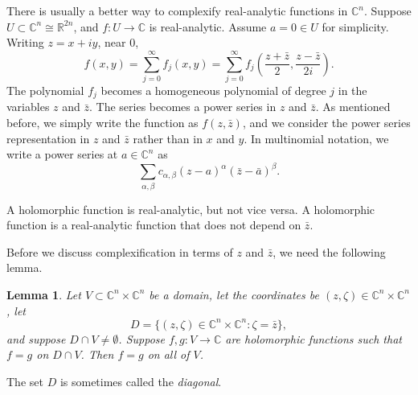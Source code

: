 \documentclass[12pt,openany]{book}
\newcommand{\C}{{\mathbb{C}}}
\newcommand{\R}{{\mathbb{R}}}
\newcommand{\myindex}[1]{#1\index{#1}}
\theoremstyle{plain}
\newtheorem{lemma}[thm]{Lemma}
\theoremstyle{remark}
\theoremstyle{definition}
\theoremstyle{exercise}
\theoremstyle{example}
\begin{document}
There is usually a better way to complexify 
real-analytic functions in $\C^n$.
Suppose $U \subset \C^n \cong \R^{2n}$, and $f \colon U \to
\C$ is real-analytic.  Assume $a=0 \in U$ for simplicity.
Writing $z = x+iy$, near $0$,
\begin{equation*}
f(x,y)
= 
\sum_{j=0}^\infty
f_j(x,y)
= 
\sum_{j=0}^\infty
f_j\left(
\frac{z+\bar{z}}{2},
\frac{z-\bar{z}}{2i}\right) .
\end{equation*}
The polynomial $f_j$ becomes a homogeneous polynomial of degree $j$
in the variables $z$ and $\bar{z}$.  The 
series becomes a power series in $z$ and $\bar{z}$.  As mentioned before,
we simply write the function as $f(z,\bar{z})$, and we consider the
power series representation in $z$ and $\bar{z}$ rather than
in $x$ and $y$.
In multinomial notation, we write a power series at $a \in \C^n$ as
\begin{equation*}
\sum_{\alpha,\beta} c_{\alpha,\beta} {(z-a)}^\alpha
{(\bar{z}-\bar{a})}^\beta .
\end{equation*}

A holomorphic function
is real-analytic, but not vice versa.  A holomorphic function
is a real-analytic function that does not depend on $\bar{z}$.

Before we discuss complexification in terms of $z$ and $\bar{z}$, we need
the following lemma.

\begin{lemma}
Let $V \subset \C^n \times \C^n$ be a domain, let the coordinates be $(z,\zeta) \in \C^n \times
\C^n$, let
\begin{equation*}
D = \bigl\{ (z,\zeta) \in \C^n \times \C^n : \zeta = \bar{z} \bigr\},
\end{equation*}
and suppose $D \cap V \not= \emptyset$.
Suppose $f,g \colon V \to \C$ are holomorphic functions such that
$f=g$ on $D \cap V$.  Then $f=g$ on all of $V$.
\end{lemma}

The set $D$ is sometimes called the \emph{\myindex{diagonal}}.
\end{document}
